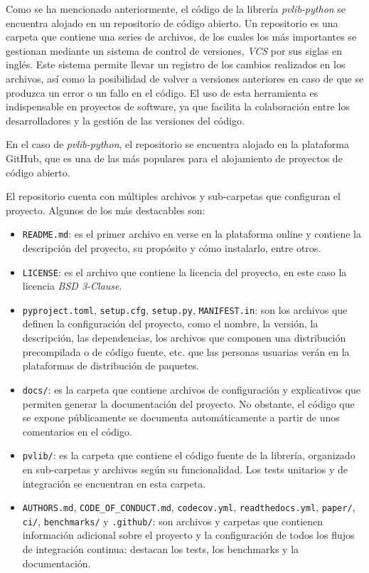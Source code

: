 Como se ha mencionado anteriormente, el código de la librería \textit{pvlib-python} se encuentra alojado en un repositorio de código abierto. Un repositorio es una carpeta que contiene una series de archivos, de los cuales los más importantes se gestionan mediante un sistema de control de versiones, \textit{VCS} por sus siglas en inglés. Este sistema permite llevar un registro de los cambios realizados en los archivos, así como la posibilidad de volver a versiones anteriores en caso de que se produzca un error o un fallo en el código. El uso de esta herramienta es indispensable en proyectos de software, ya que facilita la colaboración entre los desarrolladores y la gestión de las versiones del código.

En el caso de \textit{pvlib-python}, el repositorio se encuentra alojado en la plataforma GitHub, que es una de las más populares para el alojamiento de proyectos de código abierto.

El repositorio cuenta con múltiples archivos y sub-carpetas que configuran el proyecto. Algunos de los más destacables son:

\begin{itemize}
      \item \texttt{README.md}: es el primer archivo en verse en la plataforma online y contiene la descripción del proyecto, su propósito y cómo instalarlo, entre otros.
      \item \texttt{LICENSE}: es el archivo que contiene la licencia del proyecto, en este caso la licencia \textit{BSD 3-Clause}.
      \item \texttt{pyproject.toml}, \texttt{setup.cfg}, \texttt{setup.py}, \texttt{MANIFEST.in}: son los archivos que definen la configuración del proyecto, como el nombre, la versión, la descripción, las dependencias, los archivos que componen una distribución precompilada o de código fuente, etc. que las personas usuarias verán en la plataformas de distribución de paquetes.
      \item \texttt{docs/}: es la carpeta que contiene archivos de configuración y explicativos que permiten generar la documentación del proyecto. No obstante, el código que se expone públicamente se documenta automáticamente a partir de unos comentarios en el código.
      \item \texttt{pvlib/}: es la carpeta que contiene el código fuente de la librería, organizado en sub-carpetas y archivos según su funcionalidad. Los tests unitarios y de integración se encuentran en esta carpeta.
      \item \texttt{AUTHORS.md}, \texttt{CODE\_OF\_CONDUCT.md}, \texttt{codecov.yml}, \texttt{readthedocs.yml}, \texttt{paper/}, \texttt{ci/}, \texttt{benchmarks/} y \texttt{.github/}: son archivos y carpetas que contienen información adicional sobre el proyecto y la configuración de todos los flujos de integración continua: destacan los tests, los benchmarks y la documentación.

\end{itemize}

